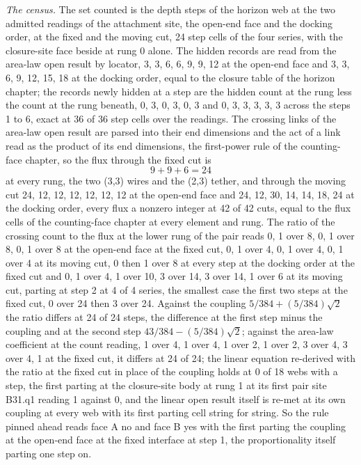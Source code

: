 \begin{chproof}
\textit{The census.} The set counted is the depth steps of the horizon web at the two admitted readings of the attachment site, the open-end face and the docking order, at the fixed and the moving cut, 24 step cells of the four series, with the closure-site face beside at rung 0 alone. The hidden records are read from the area-law open result by locator, 3, 3, 6, 6, 9, 9, 12 at the open-end face and 3, 3, 6, 9, 12, 15, 18 at the docking order, equal to the closure table of the horizon chapter; the records newly hidden at a step are the hidden count at the rung less the count at the rung beneath, 0, 3, 0, 3, 0, 3 and 0, 3, 3, 3, 3, 3 across the steps 1 to 6, exact at 36 of 36 step cells over the readings. The crossing links of the area-law open result are parsed into their end dimensions and the act of a link read as the product of its end dimensions, the first-power rule of the counting-face chapter, so the flux through the fixed cut is
\begin{equation}
9 + 9 + 6 = 24
\end{equation}
at every rung, the two (3,3) wires and the (2,3) tether, and through the moving cut 24, 12, 12, 12, 12, 12, 12 at the open-end face and 24, 12, 30, 14, 14, 18, 24 at the docking order, every flux a nonzero integer at 42 of 42 cuts, equal to the flux cells of the counting-face chapter at every element and rung. The ratio of the crossing count to the flux at the lower rung of the pair reads 0, 1 over 8, 0, 1 over 8, 0, 1 over 8 at the open-end face at the fixed cut, 0, 1 over 4, 0, 1 over 4, 0, 1 over 4 at its moving cut, 0 then 1 over 8 at every step at the docking order at the fixed cut and 0, 1 over 4, 1 over 10, 3 over 14, 3 over 14, 1 over 6 at its moving cut, parting at step 2 at 4 of 4 series, the smallest case the first two steps at the fixed cut, 0 over 24 then 3 over 24. Against the coupling $5/384 + (5/384)\sqrt{2}$ the ratio differs at 24 of 24 steps, the difference at the first step minus the coupling and at the second step $43/384 - (5/384)\sqrt{2}$; against the area-law coefficient at the count reading, 1 over 4, 1 over 4, 1 over 2, 1 over 2, 3 over 4, 3 over 4, 1 at the fixed cut, it differs at 24 of 24; the linear equation re-derived with the ratio at the fixed cut in place of the coupling holds at 0 of 18 webs with a step, the first parting at the closure-site body at rung 1 at its first pair site B31.q1 reading 1 against 0, and the linear open result itself is re-met at its own coupling at every web with its first parting cell string for string. So the rule pinned ahead reads face A no and face B yes with the first parting the coupling at the open-end face at the fixed interface at step 1, the proportionality itself parting one step on.


\end{chproof}
